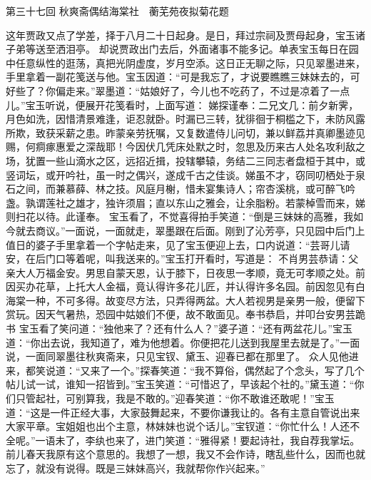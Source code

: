 \documentclass[12pt,oneside]{book}
\begin{document}
 
第三十七回  秋爽斋偶结海棠社　蘅芜苑夜拟菊花题


这年贾政又点了学差，择于八月二十日起身。是日，拜过宗祠及贾母起身，宝玉诸子弟等送至洒泪亭。
却说贾政出门去后，外面诸事不能多记。单表宝玉每日在园中任意纵性的逛荡，真把光阴虚度，岁月空添。这日正无聊之际，只见翠墨进来，手里拿着一副花笺送与他。宝玉因道：“可是我忘了，才说要瞧瞧三妹妹去的，可好些了？你偏走来。”翠墨道：“姑娘好了，今儿也不吃药了，不过是凉着了一点儿。”宝玉听说，便展开花笺看时，上面写道：
娣探谨奉：二兄文几：前夕新霁，月色如洗，因惜清景难逢，讵忍就卧。时漏已三转，犹徘徊于桐槛之下，未防风露所欺，致获采薪之患。昨蒙亲劳抚嘱，又复数遣侍儿问切，兼以鲜荔并真卿墨迹见赐，何痌瘃惠爱之深哉耶！今因伏几凭床处默之时，忽思及历来古人处名攻利敌之场，犹置一些山滴水之区，远招近揖，投辖攀辕，务结二三同志者盘桓于其中，或竖词坛，或开吟社，虽一时之偶兴，遂成千古之佳谈。娣虽不才，窃同叨栖处于泉石之间，而兼慕薛、林之技。风庭月榭，惜未宴集诗人；帘杏溪桃，或可醉飞吟盏。孰谓莲社之雄才，独许须眉；直以东山之雅会，让余脂粉。若蒙棹雪而来，娣则扫花以待。此谨奉。
宝玉看了，不觉喜得拍手笑道：“倒是三妹妹的高雅，我如今就去商议。”一面说，一面就走，翠墨跟在后面。刚到了沁芳亭，只见园中后门上值日的婆子手里拿着一个字帖走来，见了宝玉便迎上去，口内说道：“芸哥儿请安，在后门口等着呢，叫我送来的。”宝玉打开看时，写道是：
不肖男芸恭请：父亲大人万福金安。男思自蒙天恩，认于膝下，日夜思一孝顺，竟无可孝顺之处。前因买办花草，上托大人金福，竟认得许多花儿匠，并认得许多名园。前因忽见有白海棠一种，不可多得。故变尽方法，只弄得两盆。大人若视男是亲男一般，便留下赏玩。因天气暑热，恐园中姑娘们不便，故不敢面见。奉书恭启，并叩台安男芸跪书
宝玉看了笑问道：“独他来了？还有什么人？”婆子道：“还有两盆花儿。”宝玉道：“你出去说，我知道了，难为他想着。你便把花儿送到我屋里去就是了。”一面说，一面同翠墨往秋爽斋来，只见宝钗、黛玉、迎春已都在那里了。
众人见他进来，都笑说道：“又来了一个。”探春笑道：“我不算俗，偶然起了个念头，写了几个帖儿试一试，谁知一招皆到。”宝玉笑道：“可惜迟了，早该起个社的。”黛玉道：“你们只管起社，可别算我，我是不敢的。”迎春笑道：“你不敢谁还敢呢！”宝玉道：“这是一件正经大事，大家鼓舞起来，不要你谦我让的。各有主意自管说出来大家平章。宝姐姐也出个主意，林妹妹也说个话儿。”宝钗道：“你忙什么！人还不全呢。”一语未了，李纨也来了，进门笑道：“雅得紧！要起诗社，我自荐我掌坛。前儿春天我原有这个意思的。我想了一想，我又不会作诗，瞎乱些什么，因而也就忘了，就没有说得。既是三妹妹高兴，我就帮你作兴起来。”
\end{document}
